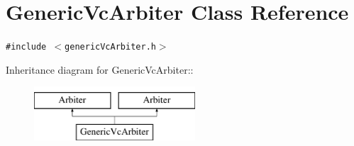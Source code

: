 \hypertarget{classGenericVcArbiter}{
\section{GenericVcArbiter Class Reference}
\label{classGenericVcArbiter}
}
{\tt \#include $<$genericVcArbiter.h$>$}

Inheritance diagram for GenericVcArbiter::\begin{figure}[H]
\begin{center}
\leavevmode
\includegraphics[height=2cm]{classGenericVcArbiter}
\end{center}
\end{figure}
